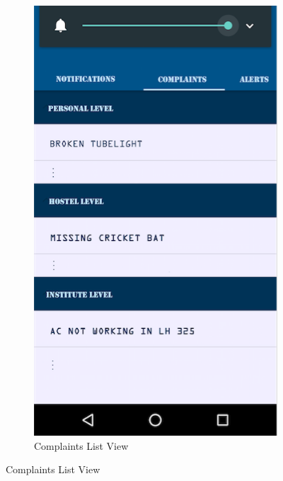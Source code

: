 \documentclass{article}
\begin{document}
\begin{figure}[H]
\begin{subfigure}{.4\textwidth}
          \includegraphics[width=0.9\linewidth]{listcomplaints.png}
          \caption{Complaints List View}
          \label{fig:sub2}
      \end{subfigure}
      \label{figstart}
    \end{figure}
\end{document}
